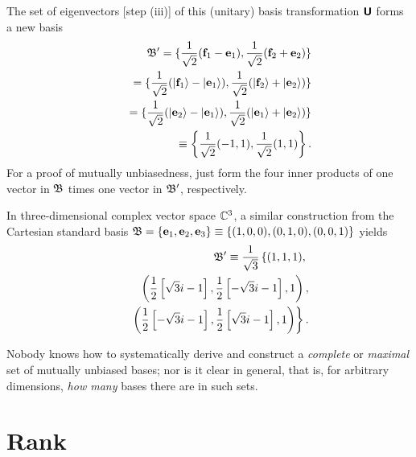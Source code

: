 {\begin{equation}
\end{equation}
The set of eigenvectors [step (iii)] of this  (unitary) basis transformation $\textsf{\textbf{U}}$ forms a new basis
\begin{equation}
\begin{split}
{\frak B}' =
\{ \frac{1}{\sqrt{2}} ({\bf f}_1 - {\bf e}_1),
 \frac{1}{\sqrt{2}}( {\bf f}_2 + {\bf e}_2 )\}
\\
 \qquad =
\{ \frac{1}{\sqrt{2}} (\vert {\bf f}_1\rangle  - \vert {\bf e}_1\rangle ),
 \frac{1}{\sqrt{2}}(\vert  {\bf f}_2 \rangle + \vert {\bf e}_2\rangle  )\}
\\
 \qquad  =
\{ \frac{1}{\sqrt{2}} (\vert {\bf e}_2\rangle  - \vert {\bf e}_1\rangle ),
 \frac{1}{\sqrt{2}}(\vert  {\bf e}_1 \rangle + \vert {\bf e}_2\rangle  )\}
\\
 \qquad \equiv \left\{ \frac{1}{\sqrt{2}}(-1,1),  \frac{1}{\sqrt{2}} (1,1)\right\}.
\end{split}
\end{equation}
For a proof of mutually unbiasedness, just form the four inner products of one vector in ${\frak B}$ times one vector in ${\frak B}'$,
respectively.

In three-dimensional complex vector space ${\Bbb C}^3$, a similar construction
from the Cartesian standard basis
${\frak B}=\{ {\bf e}_1 , {\bf e}_2, {\bf e}_3\} \equiv \{(1,0,0),(0,1,0),(0,0,1)\}$
yields
\begin{equation}
\begin{split}
 {\frak B}' \equiv   \frac{1}{\sqrt{3}}  \left\{
 (1,1,1),\right. \\
\qquad
 \left(\frac{1}{2} \left[{\sqrt{3}} i-1\right] , \frac{1}{2} \left[-{\sqrt{3}} i-1\right] ,
  1\right), \\
\qquad  \left.
 \left(
 \frac{1}{ 2} \left[-{\sqrt{3}} i-1\right], \frac{1}{ 2} \left[{\sqrt{3}} i-1\right],1  \right)
   \right\} .
\end{split}
\end{equation}
\eexample
}

Nobody knows how to systematically derive and construct a {\em complete} or {\em maximal}
set of mutually unbiased bases; nor is it clear in general, that is, for arbitrary dimensions,
{\em how many} bases there are in such sets.


\section{Rank}

